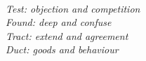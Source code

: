 \leavevmode \\
\begin{center}
    \begin{minipage}{0.6\textwidth}
        \textit{%
            Test: objection and competition \\
            Found: deep and confuse \\
            Tract: extend and agreement \\
            Duct: goods and behaviour}%
    \end{minipage}
\end{center}
